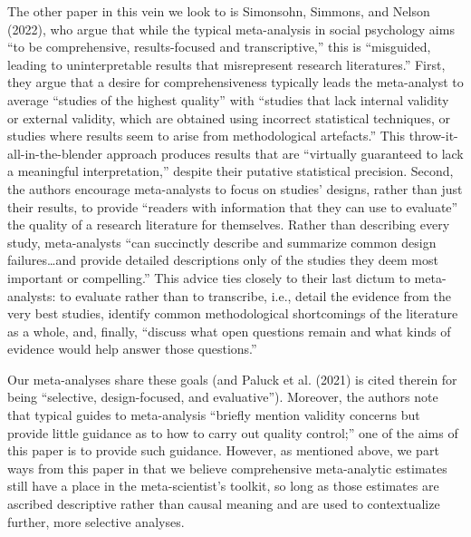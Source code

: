 \documentclass[
  man]{apa6}
\begin{document}
The other paper in this vein we look to is Simonsohn, Simmons, and Nelson (2022), who argue that while the typical meta-analysis in social psychology aims ``to be comprehensive, results-focused and transcriptive,'' this is ``misguided, leading to uninterpretable results that misrepresent research literatures.'' First, they argue that a desire for comprehensiveness typically leads the meta-analyst to average ``studies of the highest quality'' with ``studies that lack internal validity or external validity, which are obtained using incorrect statistical techniques, or studies where results seem to arise from methodological artefacts.'' This throw-it-all-in-the-blender approach produces results that are ``virtually guaranteed to lack a meaningful interpretation,'' despite their putative statistical precision. Second, the authors encourage meta-analysts to focus on studies' designs, rather than just their results, to provide ``readers with information that they can use to evaluate'' the quality of a research literature for themselves. Rather than describing every study, meta-analysts ``can succinctly describe and summarize common design failures\ldots and provide detailed descriptions only of the studies they deem most important or compelling.'' This advice ties closely to their last dictum to meta-analysts: to evaluate rather than to transcribe, i.e., detail the evidence from the very best studies, identify common methodological shortcomings of the literature as a whole, and, finally, ``discuss what open questions remain and what kinds of evidence would help answer those questions.''

Our meta-analyses share these goals (and Paluck et al. (2021) is cited therein for being ``selective, design-focused, and evaluative''). Moreover, the authors note that typical guides to meta-analysis ``briefly mention validity concerns but provide little guidance as to how to carry out quality control;'' one of the aims of this paper is to provide such guidance. However, as mentioned above, we part ways from this paper in that we believe comprehensive meta-analytic estimates still have a place in the meta-scientist's toolkit, so long as those estimates are ascribed descriptive rather than causal meaning and are used to contextualize further, more selective analyses.
\end{document}
